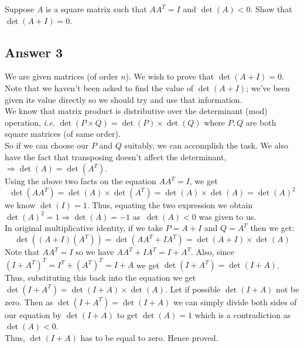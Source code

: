 Suppose \(A\) is a square matrix such that  \(AA^T = I\) and \(\det(A) < 0\). Show that \(\det(A+I) = 0\). 
\subsection*{Answer 3}
We are given matrices (of order \(n\)). We wish to prove that \(\det(A+I)=0\). Note that we haven't been asked to find the value of \(\det(A+I)\); we've been given its value directly so we should try and use that information. 
\\
We know that matrix product is distributive over the determinant (mod) operation, \textit{i.e.} \(\det(P\times Q)=\det(P)\times\det(Q) \) where \(P, Q\) are both square matrices (of same order).
\\
So if we can choose our \(P\) and \(Q\) suitably, we can accomplish the task. We also have the fact that transposing doesn't affect the determinant, \(\Rightarrow \det(A) = \det(A^T)\). 
\\
Using the above two facts on the equation \(AA^T = I\), we get \[\det(AA^T) = \det(A)\times \det(A^T) = \det(A)\times \det(A) = \det(A)^2\] we know \(\det(I)=1\). Thus, equating the two expression we obtain \(\det(A)^2 = 1 \Rightarrow \det(A)=-1\) as \(\
\det(A) < 0\) was given to us.
\\
In original multiplicative identity, if we take \(P=A+I\) and \(Q=A^T\) then we get:
\[\det((A+I)(A^T)) = \det(AA^T + IA^T) = \det(A+I)\times \det(A) \]
Note that \(AA^T=I\) so we have \(AA^T + IA^T = I + A^T\). Also, since \((I+A^T)^T = I^T + (A^T)^T = I + A\) we get \(\det(I+A^T) = \det(I+A)\).
\\
Thus, substituting this back into the equation we get \(\det(I+A^T) = \det(I+A) \times \det(A)\). Let if possible \(\det(I+A)\) not be zero. Then as \(\det(I+A^T) = \det(I+A)\) we can simply divide both sides of our equation by \(\det(I+A)\) to get \(\det(A) = 1\) which is a contradiction as \(\det(A)<0\).
\\
Thus, \(\det(I+A)\) has to be equal to zero. Hence proved.
